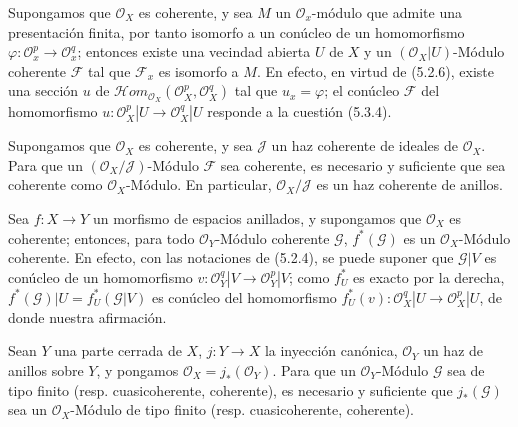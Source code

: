 \begin{env}[5.3.9]
\label{0.5.3.9-fr}
Supongamos que $\mathcal{O}_X$ es coherente, y sea $M$ un $\mathcal{O}_x$-módulo
que admite una presentación finita, por tanto isomorfo a un conúcleo de un
homomorfismo $\varphi:\mathcal{O}_x^p\to\mathcal{O}_x^q$; entonces existe una
vecindad abierta $U$ de $X$ y un $(\mathcal{O}_X|U)$-Módulo coherente
$\mathcal{F}$ tal que $\mathcal{F}_x$ es isomorfo a $M$. En efecto, en virtud
de (5.2.6), existe una sección $u$ de
$\mathcal{H}\!om_{\mathcal{O}_X}(\mathcal{O}_X^p,\mathcal{O}_X^q)$ tal que $u_x=\varphi$; el conúcleo
$\mathcal{F}$ del homomorfismo
$u:\mathcal{O}_X^p|U\to\mathcal{O}_X^q|U$ responde a la cuestión (5.3.4).
\end{env}

\begin{env}[5.3.10]
\label{0.5.3.10-fr}
Supongamos que $\mathcal{O}_X$ es coherente, y sea $\mathcal{J}$ un haz coherente
de ideales de $\mathcal{O}_X$. Para que un
$(\mathcal{O}_X/\mathcal{J})$-Módulo $\mathcal{F}$ sea coherente, es necesario y
suficiente que sea coherente como $\mathcal{O}_X$-Módulo. En particular,
$\mathcal{O}_X/\mathcal{J}$ es un haz coherente de anillos.
\end{env}

\begin{env}[5.3.11]
\label{0.5.3.11-fr}
Sea $f:X\to Y$ un morfismo de espacios anillados, y supongamos que
$\mathcal{O}_X$ es coherente; entonces, para todo $\mathcal{O}_Y$-Módulo coherente
$\mathcal{G}$, $f^*(\mathcal{G})$ es un $\mathcal{O}_X$-Módulo coherente. En
efecto, con las notaciones de (5.2.4), se puede suponer que $\mathcal{G}|V$ es
conúcleo de un homomorfismo
$v:\mathcal{O}_Y^q|V\to\mathcal{O}_Y^p|V$; como $f_U^*$ es exacto por la derecha,
$f^*(\mathcal{G})|U=f_U^*(\mathcal{G}|V)$ es conúcleo del homomorfismo
$f_U^*(v):\mathcal{O}_X^q|U\to\mathcal{O}_X^p|U$, de donde nuestra afirmación.
\end{env}

\begin{env}[5.3.12]
\label{0.5.3.12-fr}
Sean $Y$ una parte cerrada de $X$, $j:Y\to X$ la inyección canónica,
$\mathcal{O}_Y$ un haz de anillos sobre $Y$, y pongamos
$\mathcal{O}_X=j_*(\mathcal{O}_Y)$. Para que un $\mathcal{O}_Y$-Módulo
$\mathcal{G}$ sea de tipo finito (resp. cuasicoherente, coherente), es necesario y
suficiente que $j_*(\mathcal{G})$ sea un $\mathcal{O}_X$-Módulo de tipo finito
(resp. cuasicoherente, coherente).
\end{env}

